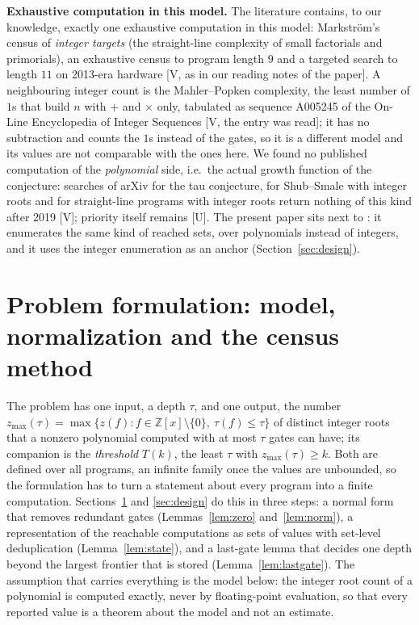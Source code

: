 \documentclass[11pt]{article}
\theoremstyle{definition}
\theoremstyle{remark}
\newcommand{\Z}{\mathbb{Z}}
\newcommand{\zmax}{z_{\max}}
\begin{document}
\textbf{Exhaustive computation in this model.} The literature contains, to our knowledge, exactly
one exhaustive computation in this model: Markstr\"om's census of \emph{integer targets} (the
straight-line complexity of small factorials and primorials), an exhaustive census to program
length $9$ and a targeted search to length $11$ on 2013-era hardware \cite{Markstrom2014}
[V, as in our reading notes of the paper]. A neighbouring integer count is the Mahler--Popken
complexity, the least number of $1$s that build $n$ with $+$ and $\times$ only, tabulated as
sequence A005245 of the On-Line Encyclopedia of Integer Sequences \cite{OEISA005245} [V, the
entry was read]; it has no subtraction and counts the $1$s instead of the gates, so it is a
different model and its values are not comparable with the ones here. We found no published
computation of the \emph{polynomial} side, i.e.\ the actual growth function of the conjecture:
searches of arXiv for the tau conjecture, for Shub--Smale with integer roots and for
straight-line programs with integer roots return nothing of this kind after 2019 [V]; priority
itself remains [U]. The present paper sits next to \cite{Markstrom2014}: it enumerates the same
kind of reached sets, over polynomials instead of integers, and it uses the integer enumeration as an
anchor (Section~\ref{sec:design}).

\section{Problem formulation: model, normalization and the census method}\label{sec:model}

The problem has one input, a depth $\tau$, and one output, the number
$\zmax(\tau) = \max\{z(f) : f \in \Z[x]\setminus\{0\},\ \tau(f) \le \tau\}$ of distinct integer roots
that a nonzero polynomial computed with at most $\tau$ gates can have; its companion is the
\emph{threshold} $T(k)$, the least $\tau$ with $\zmax(\tau) \ge k$. Both are defined over all
programs, an infinite family once the values are unbounded, so the formulation has to turn a
statement about every program into a finite computation. Sections~\ref{sec:model} and
\ref{sec:design} do this in three steps: a normal form that removes redundant gates
(Lemmas~\ref{lem:zero} and~\ref{lem:norm}), a representation of the reachable computations as sets
of values with set-level deduplication (Lemma~\ref{lem:state}), and a last-gate lemma that decides
one depth beyond the largest frontier that is stored (Lemma~\ref{lem:lastgate}). The assumption
that carries everything is the model below: the integer root count of a polynomial is computed
exactly, never by floating-point evaluation, so that every reported value is a theorem about
the model and not an estimate.
\end{document}
